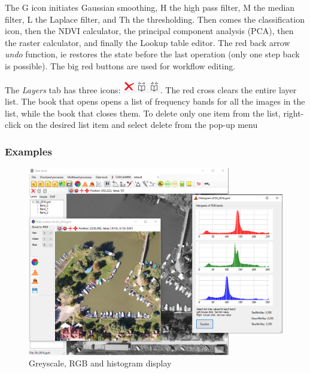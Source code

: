 \documentclass[a4paper,12pt]{article}
\begin{document}
The G icon initiates Gaussian smoothing, H the high pass filter, M the median filter, L the Laplace filter, and Th the thresholding. Then comes the classification icon, then the NDVI calculator, the principal component analysis (PCA), then the raster calculator, and finally the Lookup table editor. The red back arrow \textit {undo} function, ie restores the state before the last operation (only one step back is possible). The big red buttons are used for workflow editing.

The \textit {Layers} tab has three icons: \includegraphics [height = 0.55cm] {layer_list_icons.png}. The red cross clears the entire layer list. The book that opens opens a list of frequency bands for all the images in the list, while the book that closes them. To delete only one item from the list, right-click on the desired list item and select delete from the pop-up menu

\subsubsection{Examples}


	\begin{figure}
	\centering
	\includegraphics[width=12cm]{gw1.png}
	\caption{Greyscale, RGB and histogram display}
	\label{fig:gw1}
	\end{figure}
\end{document}
